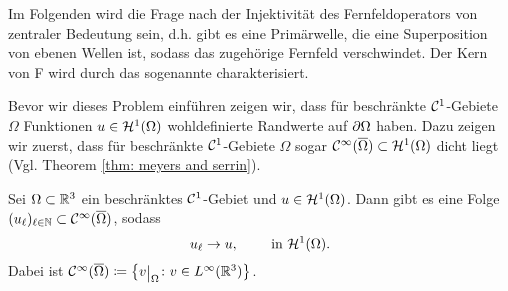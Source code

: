 Im Folgenden wird die Frage nach der Injektivität des Fernfeldoperators von zentraler Bedeutung sein, d.h. gibt es eine Primärwelle, die eine Superposition von ebenen Wellen ist, sodass das zugehörige Fernfeld verschwindet. Der Kern von F wird durch das sogenannte  charakterisiert.\vspace{2mm}

Bevor wir dieses Problem einführen zeigen wir, dass für beschränkte \(\mathcal{C}^1\)-Gebiete \(\Omega\) Funktionen \(u\in\mathcal{H}^1(\Omega)\) wohldefinierte Randwerte auf \(\partial\Omega\) haben. Dazu zeigen wir zuerst, dass für beschränkte \(\mathcal{C}^1\)-Gebiete \(\Omega\) sogar \(\mathcal{C}^\infty(\overline{\Omega})\subset\mathcal{H}^1(\Omega)\) dicht liegt (Vgl. Theorem \ref{thm: meyers and serrin}).
\begin{satz}\label{satz: dichtesatz cinfty in H1 auf Abschluss von omega}
	Sei \(\Omega\subset\mathbb{R}^3\) ein beschränktes \(\mathcal{C}^1\)-Gebiet und \(u\in\mathcal{H}^1(\Omega)\). Dann gibt es eine Folge \((u_\ell)_{\ell\in\mathbb{N}}\subset\mathcal{C}^\infty(\overline{\Omega})\), sodass
	\begin{equation*}
		u_\ell\to u,\qquad\text{ in }\mathcal{H}^1(\Omega).
	\end{equation*}
	Dabei ist \(\CC^\infty(\overline{\Omega})\coloneqq\big\{v\restrict{\Omega}\colon v\in L^\infty(\R^3)\big\}\).
\end{satz}
